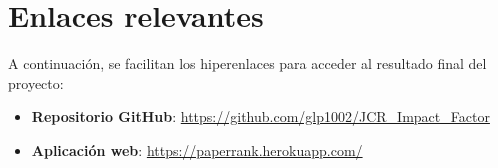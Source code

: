 \section{Enlaces relevantes}

A continuación, se facilitan los hiperenlaces para acceder al resultado final del proyecto:

\begin{itemize}
    \item \textbf{Repositorio GitHub}: \url{https://github.com/glp1002/JCR_Impact_Factor}
    \item \textbf{Aplicación web}: \url{https://paperrank.herokuapp.com/}
\end{itemize}